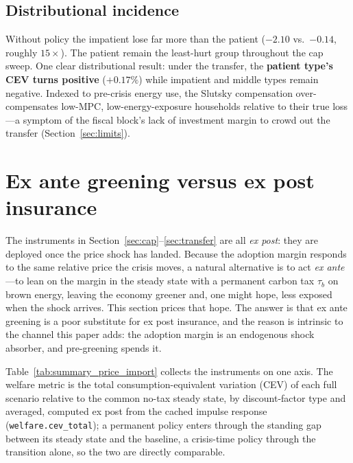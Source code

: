 \documentclass[11pt,a4paper]{article}
\begin{document}
\subsection{Distributional incidence}



Without policy the impatient lose far more than the patient ($-2.10$ vs.\
$-0.14$, roughly $15\times$). The patient remain the least-hurt group
throughout the cap sweep. One clear distributional result: under the
transfer, the \textbf{patient type's CEV turns positive} ($+0.17\%$) while
impatient and middle types remain negative. Indexed to pre-crisis energy use,
the Slutsky compensation over-compensates low-MPC, low-energy-exposure
households relative to their true loss---a symptom of the fiscal block's
lack of investment margin to crowd out the transfer (Section~\ref{sec:limits}).

\section{Ex ante greening versus ex post insurance}
\label{sec:exante}

The instruments in Section~\ref{sec:cap}--\ref{sec:transfer} are all
\emph{ex post}: they are deployed once the price shock has landed. Because the
adoption margin responds to the same relative price the crisis moves, a natural
alternative is to act \emph{ex ante}---to lean on the margin in the steady state
with a permanent carbon tax $\tau_b$ on brown energy, leaving the economy greener
and, one might hope, less exposed when the shock arrives. This section prices
that hope. The answer is that ex ante greening is a poor substitute for ex post
insurance, and the reason is intrinsic to the channel this paper adds: the
adoption margin is an endogenous shock absorber, and pre-greening spends it.

Table~\ref{tab:summary_price_import} collects the instruments on one axis. The
welfare metric is the total consumption-equivalent variation (CEV) of each full
scenario relative to the common no-tax steady state, by discount-factor type and
averaged, computed ex post from the cached impulse response
(\texttt{welfare.cev\_total}); a permanent policy enters through the standing gap
between its steady state and the baseline, a crisis-time policy through the
transition alone, so the two are directly comparable.
\end{document}
